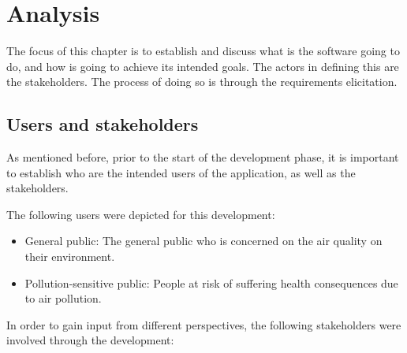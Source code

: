 \chapter{Analysis}
The focus of this chapter is to establish and discuss what is the software going to do, and how is going to achieve its intended goals. The actors in defining this are the stakeholders. The process of doing so is through the requirements elicitation. 

\section{Users and stakeholders}
As mentioned before, prior to the start of the development phase, it is important to establish who are the intended users of the application, as well as the stakeholders. 

The following users were depicted for this development:

\begin{itemize}
	\item General public: The general public who is concerned on the air quality on their environment.
    \item Pollution-sensitive public: People at risk of suffering health consequences due to air pollution.
\end{itemize}

In order to gain input from different perspectives, the following stakeholders were involved through the development: 

